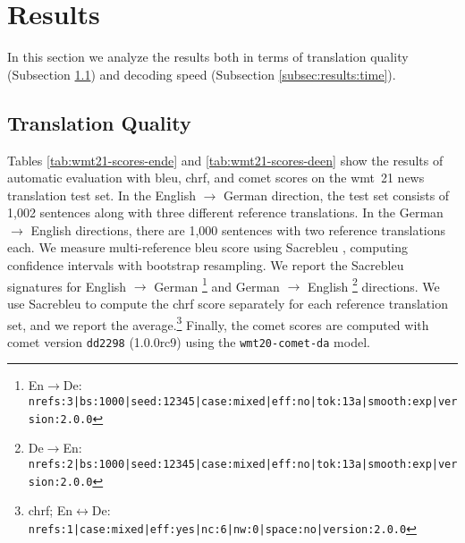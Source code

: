 \section{Results}%
\label{sec:results}

In this section we analyze the results both in terms of translation quality
(Subsection \ref{subsec:results:quality}) and decoding speed (Subsection
\ref{subsec:results:time}).


\subsection{Translation Quality}%
\label{subsec:results:quality}

Tables \ref{tab:wmt21-scores-ende} and \ref{tab:wmt21-scores-deen} show the
results of automatic evaluation with \acs{bleu}, \acs{chrf}, and \acs{comet}
scores on the \acs{wmt}~21 news translation test set. In the English
$\rightarrow$ German direction, the test set consists of 1,002 sentences along
with three different reference translations. In the German $\rightarrow$
English directions, there are 1,000 sentences with two reference translations
each. We measure multi-reference \acs{bleu} score using Sacrebleu
\citep{post-2018-call}, computing confidence intervals with bootstrap
resampling. We report the Sacrebleu signatures for English $\rightarrow$
German%
\footnote{En$\rightarrow$De: {\scriptsize
    \texttt{nrefs:3|bs:1000|seed:12345|case:mixed|eff:no|tok:13a|smooth:exp|version:2.0.0}}}
and German $\rightarrow$ English%
\footnote{De$\rightarrow$En: {\scriptsize
    \texttt{nrefs:2|bs:1000|seed:12345|case:mixed|eff:no|tok:13a|smooth:exp|version:2.0.0}}}
directions. We use Sacrebleu to compute the \acs{chrf} score separately for
each reference translation set, and we report the average.\footnote{\acs{chrf};
  En$\leftrightarrow$De: {\scriptsize
    \texttt{nrefs:1|case:mixed|eff:yes|nc:6|nw:0|space:no|version:2.0.0}}}
Finally, the \acs{comet} scores are computed with \acs{comet} version
\texttt{dd2298} (1.0.0rc9) using the \texttt{wmt20-comet-da} model.


